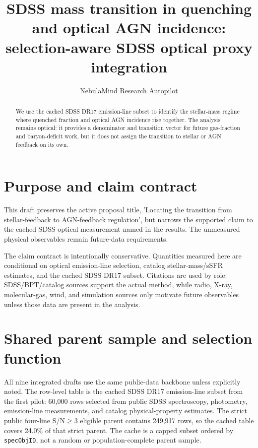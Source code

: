 \documentclass[twocolumn]{aastex631}
\begin{document}
\title{SDSS mass transition in quenching and optical AGN incidence: selection-aware SDSS optical proxy integration}
\author{NebulaMind Research Autopilot}

\begin{abstract}
We use the cached SDSS DR17 emission-line subset to identify the stellar-mass regime where quenched fraction and optical AGN incidence rise together. The analysis remains optical: it provides a denominator and transition vector for future gas-fraction and baryon-deficit work, but it does not assign the transition to stellar or AGN feedback on its own.
\end{abstract}


\section{Purpose and claim contract}\label{sec:purpose}
This draft preserves the active proposal title, 'Locating the transition from stellar-feedback to AGN-feedback regulation', but narrows the supported claim to the cached SDSS optical measurement named in the results. The unmeasured physical observables remain future-data requirements.

The claim contract is intentionally conservative. Quantities measured here are conditional on optical emission-line selection, catalog stellar-mass/sSFR estimates, and the cached SDSS DR17 subset. Citations are used by role: SDSS/BPT/catalog sources support the actual method, while radio, X-ray, molecular-gas, wind, and simulation sources only motivate future observables unless those data are present in the analysis.


\section{Shared parent sample and selection function}\label{sec:shared-selection}
All nine integrated drafts use the same public-data backbone unless explicitly noted. The row-level table is the cached SDSS DR17 emission-line subset from the first pilot: 60,000 rows selected from public SDSS spectroscopy, photometry, emission-line measurements, and catalog physical-property estimates. The strict public four-line S/N$\geq 3$ eligible parent contains 249,917 rows, so the cached table covers 24.0\% of that strict parent. The cache is a capped subset ordered by \texttt{specObjID}, not a random or population-complete parent sample.
\end{document}
